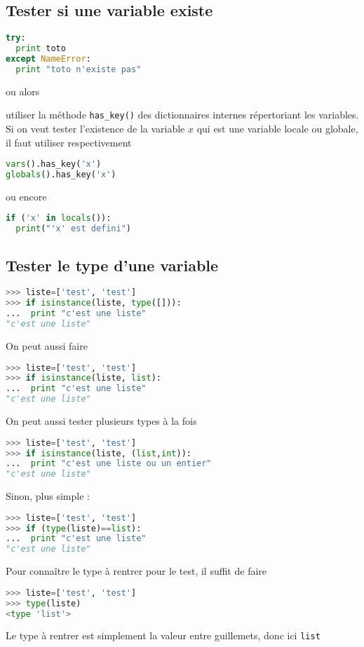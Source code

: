 \documentclass[a4paper,twoside]{article}
\begin{document}
\subsection{Tester si une variable existe}
\begin{lstlisting}[language=python]
try:
  print toto
except NameError:
  print "toto n'existe pas"
\end{lstlisting}

ou alors

utiliser la méthode \texttt{has\_key()} des dictionnaires internes répertoriant les variables. Si on veut tester l'existence de la variable $x$  qui est une variable locale ou globale, il faut utiliser respectivement
\begin{lstlisting}[language=python]
vars().has_key('x')
globals().has_key('x')
\end{lstlisting}

ou encore
\begin{lstlisting}[language=python]
if ('x' in locals()):
  print("'x' est defini")
\end{lstlisting}


\subsection{Tester le type d'une variable}
\begin{lstlisting}[language=python]
>>> liste=['test', 'test']
>>> if isinstance(liste, type([])):
...  print "c'est une liste"
"c'est une liste"
\end{lstlisting}

On peut aussi faire
\begin{lstlisting}[language=python]
>>> liste=['test', 'test']
>>> if isinstance(liste, list):
...  print "c'est une liste"
"c'est une liste"
\end{lstlisting}

On peut aussi tester plusieurs types à la fois
\begin{lstlisting}[language=python]
>>> liste=['test', 'test']
>>> if isinstance(liste, (list,int)):
...  print "c'est une liste ou un entier"
"c'est une liste"
\end{lstlisting}

Sinon, plus simple :
\begin{lstlisting}[language=python]
>>> liste=['test', 'test']
>>> if (type(liste)==list):
...  print "c'est une liste"
"c'est une liste"
\end{lstlisting}

Pour connaître le type à rentrer pour le test, il suffit de faire
\begin{lstlisting}[language=python]
>>> liste=['test', 'test']
>>> type(liste)
<type 'list'>
\end{lstlisting}
Le type à rentrer est simplement la valeur entre guillemets, donc ici \texttt{list}
\end{document}
